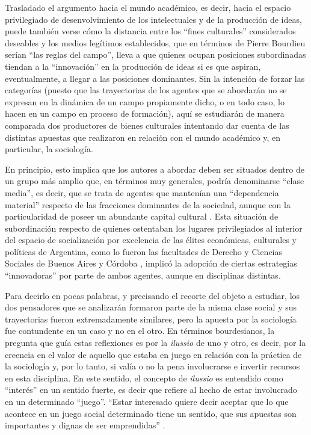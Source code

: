 Trasladado el argumento hacia el mundo académico, es decir, hacia el espacio privilegiado de desenvolvimiento de los intelectuales y de la producción de ideas, puede también verse cómo la distancia entre los \enquote{fines culturales} considerados deseables y los medios legítimos establecidos, que en términos de Pierre Bourdieu serían \enquote{las reglas del campo}, lleva a que quienes ocupan posiciones subordinadas tiendan a la \enquote{innovación} en la producción de ideas si es que aspiran, eventualmente, a llegar a las posiciones dominantes. Sin la intención de forzar las categorías (puesto que las trayectorias de los agentes que se abordarán no se expresan en la dinámica de un campo propiamente dicho, o en todo caso, lo hacen en un campo en proceso de formación), aquí se estudiarán de manera comparada dos productores de bienes culturales intentando dar cuenta de las distintas apuestas que realizaron en relación con el mundo académico y, en particular, la sociología.

En principio, esto implica que los autores a abordar deben ser situados dentro de un grupo más amplio que, en términos muy generales, podría denominarse \enquote{clase media}, es decir, que se trata de agentes que mantenían una \enquote{dependencia material} respecto de las fracciones dominantes de la sociedad, aunque con la particularidad de poseer un abundante capital cultural \parencite{1576-BOURDIEU1999}. Esta situación de subordinación respecto de quienes ostentaban los lugares privilegiados al interior del espacio de socialización por excelencia de las élites económicas, culturales y políticas de Argentina, como lo fueron las facultades de Derecho y Ciencias Sociales de Buenos Aires y Córdoba \parencite{277-AGUERO2017,1542-ORTIZ2012}, implicó la adopción de ciertas estrategias \enquote{innovadoras} por parte de ambos agentes, aunque en disciplinas distintas.

Para decirlo en pocas palabras, y precisando el recorte del objeto a estudiar, los dos pensadores que se analizarán formaron parte de la misma clase social y sus trayectorias fueron extremadamente similares, pero la apuesta por la sociología fue contundente en un caso y no en el otro. En términos bourdesianos, la pregunta que guía estas reflexiones es por la \emph{ilussio} de uno y otro, es decir, por la creencia en el valor de aquello que estaba en juego en relación con la práctica de la sociología y, por lo tanto, si valía o no la pena involucrarse e invertir recursos en esta disciplina. En este sentido, el concepto de \emph{ilussio} es entendido como \enquote{interés} en un sentido fuerte, es decir que refiere al hecho de estar involucrado en un determinado \enquote{juego}. \enquote{Estar interesado quiere decir aceptar que lo que acontece en un juego social determinado tiene un sentido, que sus apuestas son importantes y dignas de ser emprendidas} \parencite[80]{1577-BOURDIEU1995}.


